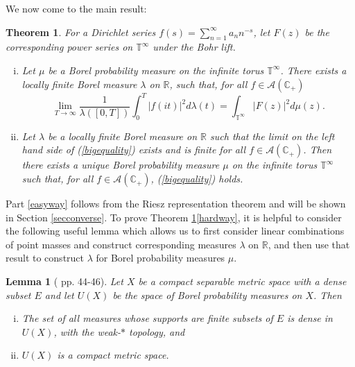 \documentclass[]{elsarticle}
\newcommand{\R}{\mathbb{R}}
\newcommand{\T}{\mathbb{T}}
\newcommand{\cA}{\mathcal{A}}
\newcommand{\cplus}{\mathbb{C}_{+}}
\numberwithin{equation}{section}
\newtheorem{thm}[prop]{Theorem}
\newtheorem{lemma}{Lemma}
\begin{document}
  We now come to the main result:
  \begin{thm} \label{mainthm}
    For a Dirichlet series $f(s)=\sum_{n=1}^\infty a_n n^{-s}$, let $F(z)$ be the corresponding power series on $\T^\infty$ under the Bohr lift.
    \begin{enumerate}[(i)]
      \item\label{hardway} Let \(\mu\) be a Borel probability measure on the infinite torus \(\T^{\infty}\). There exists a locally finite Borel measure \(\lambda\) on $\R$, such that, for all $f \in \cA(\cplus)$ 
      \begin{equation} \label{bigequality}
        \lim_{T \to \infty} \frac{1}{\lambda([0,T])} \int_{0}^{T}\left|f(it)\right|^2 d\lambda(t)
        = \int_{\T^{\infty}} \left| F(z) \right|^2 d\mu(z).
      \end{equation} 
      \item\label{easyway} Let $\lambda$ be a locally finite Borel measure on $\R$ such that the limit on the left hand side of (\ref{bigequality}) exists and is finite for all $f \in \cA(\cplus)$. Then there exists a unique Borel probability measure $\mu$ on the infinite torus \(\T^{\infty}\) such that, for all $f \in \cA(\cplus)$, (\ref{bigequality}) holds.
    \end{enumerate}
  \end{thm} 

  Part \ref{easyway} follows from the Riesz representation theorem and will be shown in Section \ref{secconverse}.
  To prove Theorem \ref{mainthm}\ref{hardway}, it is helpful to consider the following useful lemma which allows us to first consider linear combinations of point masses and construct corresponding measures $\lambda$ on $\R$, and then use that result to construct $\lambda$ for Borel probability measures $\mu$.
    \begin{lemma}[\cite{parthaProb} pp. 44-46] \label{dense}
      Let $X$ be a compact separable metric space with a dense subset $E$ and let $U(X)$ be the space of Borel probability measures on $X$. Then 
      \begin{enumerate}[(i)]
        \item The set of all measures whose supports are finite subsets of $E$ is dense in $U(X)$, with the weak-$\ast$ topology, and
        \item $U(X)$ is a compact metric space.
      \end{enumerate}
    \end{lemma}
  
\end{document}
